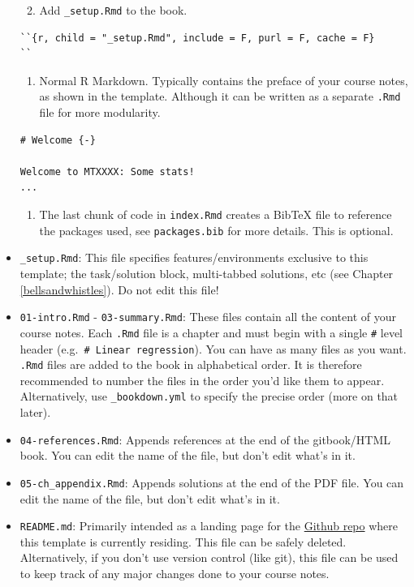\documentclass[
  oneside]{krantz}
\providecommand{\tightlist}{%
  \setlength{\itemsep}{0pt}\setlength{\parskip}{0pt}}
\theoremstyle{definition}
\theoremstyle{definition}
\theoremstyle{definition}
\theoremstyle{remark}
\begin{document}
\begin{itemize}
  \begin{enumerate}
  \def\labelenumi{\arabic{enumi}.}
  \setcounter{enumi}{2}
  \tightlist
  \item
    Add \texttt{\_setup.Rmd} to the book.
  \end{enumerate}

\begin{verbatim}
``{r, child = "_setup.Rmd", include = F, purl = F, cache = F}
``
\end{verbatim}

  \begin{enumerate}
  \def\labelenumi{\arabic{enumi}.}
  \setcounter{enumi}{3}
  \tightlist
  \item
    Normal R Markdown. Typically contains the preface of your course notes, as shown in the template.
    Although it can be written as a separate \texttt{.Rmd} file for more modularity.
  \end{enumerate}

\begin{verbatim}
# Welcome {-}

Welcome to MTXXXX: Some stats!
...
\end{verbatim}

  \begin{enumerate}
  \def\labelenumi{\arabic{enumi}.}
  \setcounter{enumi}{4}
  \tightlist
  \item
    The last chunk of code in \texttt{index.Rmd} creates a BibTeX file to reference the packages used, see \texttt{packages.bib} for more details. This is optional.
  \end{enumerate}
\item
  \texttt{\_setup.Rmd}: This file specifies features/environments exclusive to this template; the task/solution block, multi-tabbed solutions, etc (see Chapter \ref{bellsandwhistles}).
  Do not edit this file!
\item
  \texttt{01-intro.Rmd} - \texttt{03-summary.Rmd}: These files contain all the content of your course notes. Each \texttt{.Rmd} file is a chapter and must begin with a single \texttt{\#} level header (e.g.~\texttt{\#\ Linear\ regression}). You can have as many files as you want. \texttt{.Rmd} files are added to the book in alphabetical order. It is therefore recommended to number the files in the order you'd like them to appear. Alternatively, use \texttt{\_bookdown.yml} to specify the precise order (more on that later).
\item
  \texttt{04-references.Rmd}: Appends references at the end of the gitbook/HTML book. You can edit the name of the file, but don't edit what's in it.
\item
  \texttt{05-ch\_appendix.Rmd}: Appends solutions at the end of the PDF file. You can edit the name of the file, but don't edit what's in it.
\item
  \texttt{README.md}: Primarily intended as a landing page for the \href{https://github.com/lindesaysh/StAndrewsTemplateBookdown}{Github repo} where this template is currently residing. This file can be safely deleted. Alternatively, if you don't use version control (like git), this file can be used to keep track of any major changes done to your course notes.
\end{itemize}
\end{document}
